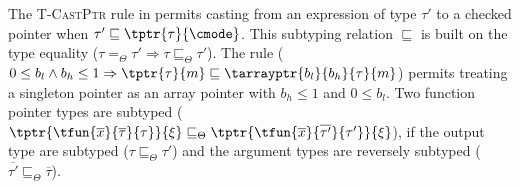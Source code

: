 The \textsc{T-CastPtr} rule in 
permits casting from an expression of type $\tau'$ to a checked pointer when
$\tau' \sqsubseteq \tptr{\tau}{\cmode}$. This subtyping relation
$\sqsubseteq$ is built on the type equality ($\tau =_{\Theta} \tau'\Rightarrow\tau \sqsubseteq_{\Theta} \tau'$). 
The rule  ($0\le b_l \wedge b_h \le 1 \Rightarrow \tptr{\tau}{m}\sqsubseteq
\tarrayptr{b_l}{b_h}{\tau}{m}$) permits treating a singleton
pointer as an array pointer with $b_h\le 1$ and $0 \le b_l$.
Two function pointer types are subtyped ($\tptr{\tfun{\overline{x}}{\overline{\tau}}{\tau}}{\xi} \sqsubseteq_{\Theta} \tptr{\tfun{\overline{x}}{\overline{\tau'}}{\tau'}}{\xi}$), 
if the output type are subtyped ($\tau\sqsubseteq_{\Theta}\tau'$) and the argument types are reversely subtyped ($\overline{\tau'}\sqsubseteq_{\Theta}\overline{\tau}$).

